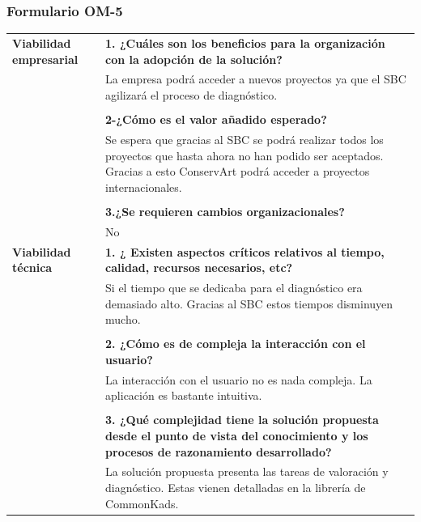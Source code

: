 \documentclass[a4paper,11pt]{article}
\begin{document}
			\subsubsection{Formulario OM-5}
			\begin{center}
				\begin{tabular}{| p{4.5cm} | p{7cm} |}
					\hline
					\textbf{Viabilidad empresarial} & 
					\textbf{1. ¿Cuáles son los beneficios para la organización con la adopción
					de la solución?}\\
					& La empresa podrá acceder a nuevos proyectos ya que el
					SBC agilizará el proceso de diagnóstico.\\
					& \\
					& \textbf{2-¿Cómo es el valor añadido esperado?}\\
					& Se espera que gracias al SBC se podrá realizar todos los proyectos que
					hasta ahora no han podido ser aceptados. Gracias a esto ConservArt podrá acceder a proyectos internacionales.\\
					& \\
					& \textbf{3.¿Se requieren cambios organizacionales?}\\
					& No\\
					\hline
					\textbf{Viabilidad técnica} & 
					\textbf{1. ¿ Existen aspectos críticos relativos al tiempo, calidad,
					recursos necesarios, etc?}\\
					& Si el tiempo que se dedicaba para el diagnóstico era demasiado alto.
					Gracias al SBC estos tiempos disminuyen mucho.\\
					& \\
					& \textbf{2. ¿Cómo es de compleja la interacción con el usuario?}\\
					& La interacción con el usuario no es nada compleja. La aplicación es
					bastante intuitiva.\\
					& \\
					& \textbf{3. ¿Qué complejidad tiene la solución propuesta desde el punto de
					vista del conocimiento y los procesos de razonamiento desarrollado?}\\
					& La solución propuesta presenta las tareas de valoración y diagnóstico.
					Estas vienen detalladas en la librería de CommonKads.\\
					\hline
				\end{tabular}
			\end{center}
			\newpage
\end{document}
